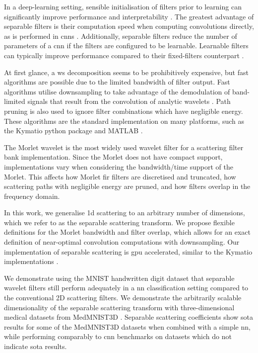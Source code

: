 \documentclass[journal]{IEEEtran}
\begin{document}
In a deep-learning setting, sensible initialisation of filters prior to learning can significantly improve performance and interpretability \cite{sincnet}. The greatest advantage of separable filters is their computation speed when computing convolutions directly, as is performed in \acp{cnn} \cite{separablecnn}. Additionally, separable filters reduce the number of parameters of a \ac{cnn} if the filters are configured to be learnable. Learnable filters can typically improve performance compared to their fixed-filters counterpart \cite{scattering_birdsong}. 

At first glance, a \ac{ws} decomposition seems to be prohibitively expensive, but fast algorithms are possible due to the limited bandwidth of filter output. Fast algorithms utilise downsampling to take advantage of the demodulation of band-limited signals that result from the convolution of analytic wavelets \cite{2dscattering, 3dscattering, 1dscattering1}. Path pruning is also used to ignore filter combinations which have negligible energy. These algorithms are the standard implementation on many platforms, such as the Kymatio python package \cite{kymatio} and MATLAB \cite{MATLAB}.

The Morlet wavelet is the most widely used wavelet filter for a scattering filter bank implementation. Since the Morlet does not have compact support, implementations vary when considering the bandwidth/time support of the Morlet. This affects how Morlet \ac{fir} filters are discretised and truncated, how scattering paths with negligible energy are pruned, and how filters overlap in the frequency domain. 

In this work, we generalise \ac{1d} scattering to an arbitrary number of dimensions, which we refer to as the separable scattering transform. We propose flexible definitions for the Morlet bandwidth and filter overlap, which allows for an exact definition of near-optimal convolution computations with downsampling. Our implementation of separable scattering is \ac{gpu} accelerated, similar to the Kymatio implementations \cite{kymatio}. 

We demonstrate using the MNIST handwritten digit dataset \cite{mnist} that separable wavelet filters still perform adequately in a \ac{nn} classification setting compared to the conventional 2D scattering filters. We demonstrate the arbitrarily scalable dimensionality of the separable scattering transform with three-dimensional medical datasets from MedMNIST3D \cite{medmnist}. Separable scattering coefficients show \ac{sota} results for some of the MedMNIST3D datasets when combined with a simple \ac{nn}, while performing comparably to \ac{cnn} benchmarks on datasets which do not indicate \ac{sota} results.
\end{document}
